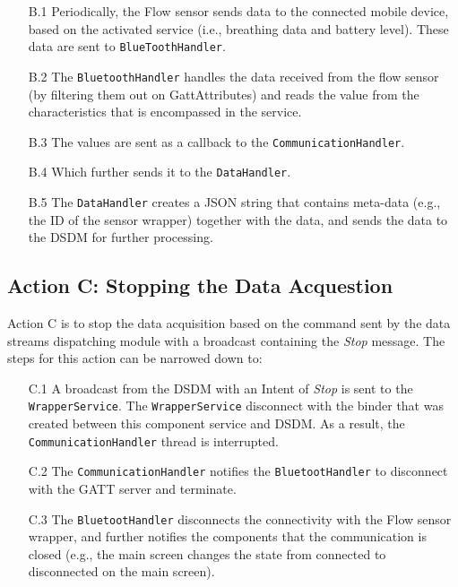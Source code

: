 \begin{itemize}
    \item[B.1] Periodically, the Flow sensor sends data to the connected mobile device, based on the activated service (i.e., breathing data and battery level). These data are sent to \verb|BlueToothHandler|. 
    \item[B.2]  The \verb|BluetoothHandler| handles the data received from the flow sensor (by filtering them out on GattAttributes) and reads the value from the characteristics that is encompassed in the service.
    \item[B.3] The values are sent as a callback to the \verb|CommunicationHandler|. 
    \item[B.4] Which further sends it to the \verb|DataHandler|.
    \item[B.5] The \verb|DataHandler| creates a JSON string that contains meta-data (e.g., the ID of the sensor wrapper) together with the data, and sends the data to the DSDM for further processing.    
\end{itemize}


\subsection{Action C: Stopping the Data Acquestion}
Action C is to stop the data acquisition based on the command sent by the data streams dispatching module with a broadcast containing the \textit{Stop} message. The steps for this action can be narrowed down to:


\begin{itemize}
    \item[C.1] A broadcast from the DSDM with an Intent of \textit{Stop} is sent to the \verb|WrapperService|. The \verb|WrapperService| disconnect with the binder that was created between this component service and DSDM. As a result, the \verb|CommunicationHandler| thread is interrupted.
    \item[C.2] The \verb|CommunicationHandler| notifies the \verb|BluetootHandler| to disconnect with the GATT server and terminate.
    \item[C.3] The \verb|BluetootHandler| disconnects the connectivity with the Flow sensor wrapper, and further notifies the components that the communication is closed (e.g., the main screen changes the state from connected to disconnected on the main screen). 
\end{itemize}

